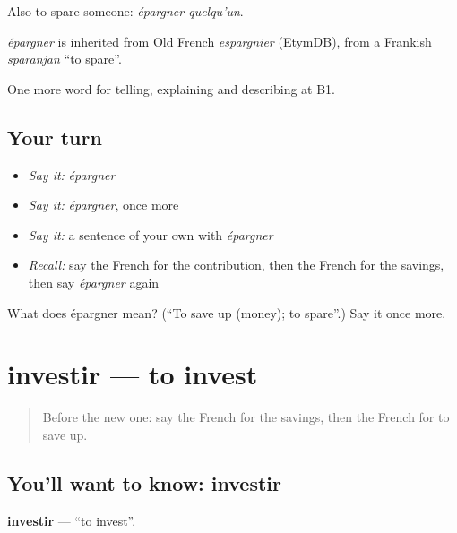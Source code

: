 Also to spare someone: \emph{épargner quelqu'un}.

\begin{cousinweb}
\emph{épargner} is inherited from Old French \emph{espargnier} (EtymDB), from a Frankish \emph{sparanjan} \textquotedblleft{}to spare\textquotedblright{}.
\end{cousinweb}

\begin{grammarlens}[title={What you've built}]
One more word for telling, explaining and describing at B1.
\end{grammarlens}

\subsection*{Your turn}
\begin{itemize}
\raggedright
  \item \emph{Say it:} \emph{épargner}
  \item \emph{Say it:} \emph{épargner}, once more
  \item \emph{Say it:} a sentence of your own with \emph{épargner}
  \item \emph{Recall:} say the French for the contribution, then the French for the savings, then say \emph{épargner} again
\end{itemize}

\begin{tcolorbox}[breakable,colback=teal!4,colframe=teal!35!black,title={Before you move on}]
What does épargner mean? (\textquotedblleft{}To save up (money); to spare\textquotedblright{}.) Say it once more.
\end{tcolorbox}
\section[investir]{investir — to invest}

\label{lesson:FR-C391-investir}



\begin{quote}
Before the new one: say the French for the savings, then the French for to save up.
\end{quote}

\subsection*{You'll want to know: investir}
\textbf{investir} — \textquotedblleft{}to invest\textquotedblright{}.

